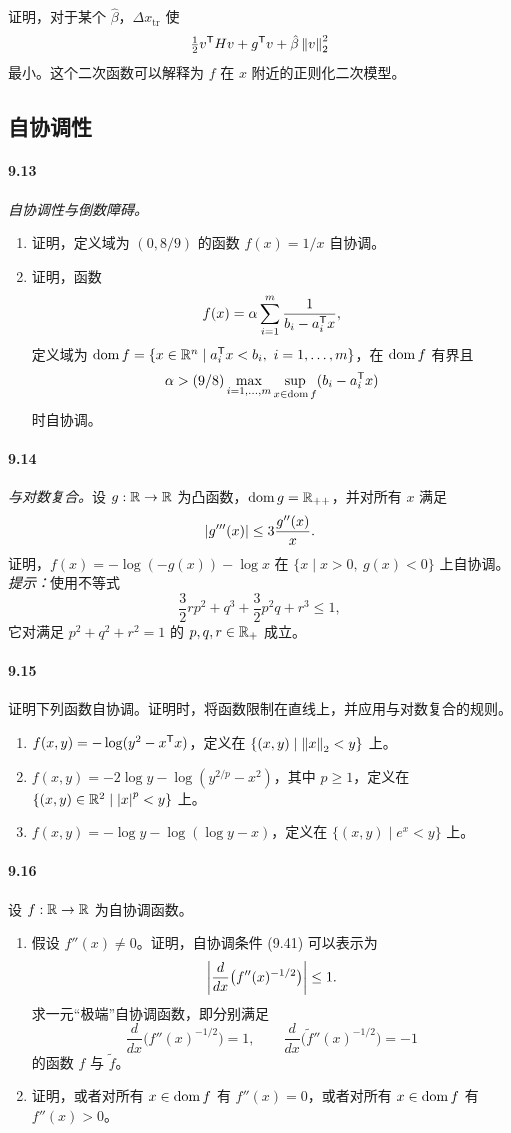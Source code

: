 证明，对于某个 $\hat\beta$，$\Delta x_{\mathrm{tr}}$ 使
\[
 \tfrac12v^\mathsf T Hv+g^\mathsf T v+\hat\beta\left\lVert v\right\rVert_2^2
\]
最小。这个二次函数可以解释为 $f$ 在 $x$ 附近的正则化二次模型。

\subsection*{自协调性}
\paragraph{9.13} \emph{自协调性与倒数障碍。}
\begin{enumerate}[label=(\alph*)]
\item 证明，定义域为 $(0,8/9)$ 的函数 $f(x)=1/x$ 自协调。
\item 证明，函数
\[
 f(x)=\alpha\sum_{i=1}^m\frac1{b_i-a_i^\mathsf T x},
\]
定义域为 $\operatorname{dom} f=\{x\in\mathbb R^n\mid a_i^\mathsf T x<b_i,\ i=1,\ldots,m\}$，在 $\operatorname{dom} f$ 有界且
\[
 \alpha>(9/8)\max_{i=1,\ldots,m}\sup_{x\in\operatorname{dom} f}(b_i-a_i^\mathsf T x)
\]
时自协调。
\end{enumerate}

\paragraph{9.14} \emph{与对数复合。}设 $g:\mathbb R\to\mathbb R$ 为凸函数，$\operatorname{dom} g=\mathbb R_{++}$，并对所有 $x$ 满足
\[
 \left\lvert g'''(x)\right\rvert\le3\frac{g''(x)}x.
\]
证明，$f(x)=-\log(-g(x))-\log x$ 在 $\{x\mid x>0,\ g(x)<0\}$ 上自协调。\emph{提示：}使用不等式
\[
 \frac32rp^2+q^3+\frac32p^2q+r^3\le1,
\]
它对满足 $p^2+q^2+r^2=1$ 的 $p,q,r\in\mathbb R_+$ 成立。

\paragraph{9.15} 证明下列函数自协调。证明时，将函数限制在直线上，并应用与对数复合的规则。
\begin{enumerate}[label=(\alph*)]
\item $f(x,y)=-\log(y^2-x^\mathsf T x)$，定义在 $\{(x,y)\mid\left\lVert x\right\rVert_2<y\}$ 上。
\item $f(x,y)=-2\log y-\log(y^{2/p}-x^2)$，其中 $p\ge1$，定义在 $\{(x,y)\in\mathbb R^2\mid\left\lvert x\right\rvert^p<y\}$ 上。
\item $f(x,y)=-\log y-\log(\log y-x)$，定义在 $\{(x,y)\mid e^x<y\}$ 上。
\end{enumerate}

\paragraph{9.16} 设 $f:\mathbb R\to\mathbb R$ 为自协调函数。
\begin{enumerate}[label=(\alph*)]
\item 假设 $f''(x)\ne0$。证明，自协调条件 (9.41) 可以表示为
\[
 \left\lvert \frac d{dx}\bigl(f''(x)^{-1/2}\bigr)\right\rvert\le1.
\]
求一元“极端”自协调函数，即分别满足
\[
 \frac d{dx}\bigl(f''(x)^{-1/2}\bigr)=1,\qquad
 \frac d{dx}\bigl(\widetilde f''(x)^{-1/2}\bigr)=-1
\]
的函数 $f$ 与 $\widetilde f$。
\item 证明，或者对所有 $x\in\operatorname{dom} f$ 有 $f''(x)=0$，或者对所有 $x\in\operatorname{dom} f$ 有 $f''(x)>0$。
\end{enumerate}

